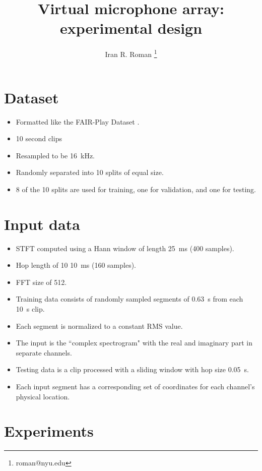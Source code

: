 \documentclass[14pt]{extarticle}
\title{Virtual microphone array: experimental design}
\author{Iran R. Roman \thanks{roman@nyu.edu}}
\affil{Music and Audio Research Laboratory, New York University}
\date{}
\begin{document}
\maketitle
\tableofcontents

\vspace{.25in}

\section{Dataset}

\begin{itemize}

\item Formatted like the FAIR-Play Dataset \cite{gao2019visualsound}.

\item 10 second clips

\item Resampled to be \SI{16}{\kilo\hertz}.

\item Randomly separated into 10 splits of equal size.

\item 8 of the 10 splits are used for training, one for validation, and one for testing. 

\end{itemize}

\section{Input data}

\begin{itemize}

\item STFT computed using a Hann window of length \SI{25}{\milli\second} (400 samples).

\item Hop length of 10 \SI{10}{\milli\second} (160 samples).

\item FFT size of 512. 

\item Training data consists of randomly sampled segments of \SI{0.63}{\second} from each \SI{10}{\second} clip. 

\item Each segment is normalized to a constant RMS value. 

\item The input is the ``complex spectrogram" with the real and imaginary part in separate channels. 

\item Testing data is a clip processed with a sliding window with hop size \SI{0.05}{\second}.

\item Each input segment has a corresponding set of coordinates for each channel's physical location.

\end{itemize}

\section{Experiments}





\end{document}
